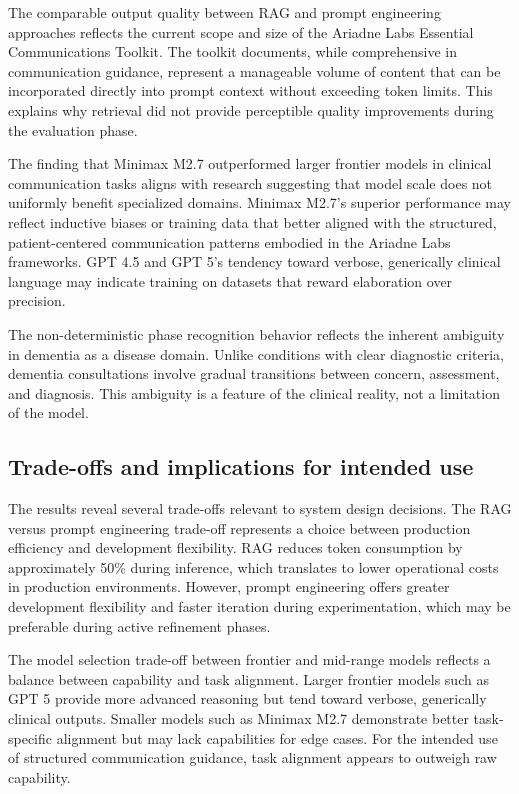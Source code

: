 The comparable output quality between RAG and prompt engineering approaches reflects the current scope and size of the Ariadne Labs Essential Communications Toolkit. The toolkit documents, while comprehensive in communication guidance, represent a manageable volume of content that can be incorporated directly into prompt context without exceeding token limits. This explains why retrieval did not provide perceptible quality improvements during the evaluation phase.

The finding that Minimax M2.7 outperformed larger frontier models in clinical communication tasks aligns with research suggesting that model scale does not uniformly benefit specialized domains. Minimax M2.7's superior performance may reflect inductive biases or training data that better aligned with the structured, patient-centered communication patterns embodied in the Ariadne Labs frameworks. GPT 4.5 and GPT 5's tendency toward verbose, generically clinical language may indicate training on datasets that reward elaboration over precision.

The non-deterministic phase recognition behavior reflects the inherent ambiguity in dementia as a disease domain. Unlike conditions with clear diagnostic criteria, dementia consultations involve gradual transitions between concern, assessment, and diagnosis. This ambiguity is a feature of the clinical reality, not a limitation of the model.

\subsection{Trade-offs and implications for intended use}

The results reveal several trade-offs relevant to system design decisions. The RAG versus prompt engineering trade-off represents a choice between production efficiency and development flexibility. RAG reduces token consumption by approximately 50\% during inference, which translates to lower operational costs in production environments. However, prompt engineering offers greater development flexibility and faster iteration during experimentation, which may be preferable during active refinement phases.

The model selection trade-off between frontier and mid-range models reflects a balance between capability and task alignment. Larger frontier models such as GPT 5 provide more advanced reasoning but tend toward verbose, generically clinical outputs. Smaller models such as Minimax M2.7 demonstrate better task-specific alignment but may lack capabilities for edge cases. For the intended use of structured communication guidance, task alignment appears to outweigh raw capability.

